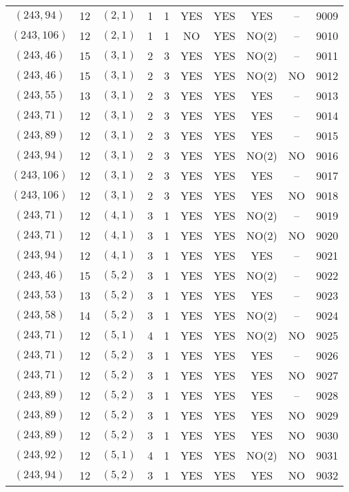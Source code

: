 \begin{longtable}{|c|c|c|c|c|c|c|c|c|c|}
$(243, 94)$ & 12 & $(2, 1)$ & 1 & 1 & YES & YES & YES & -- & 9009\\
$(243, 106)$ & 12 & $(2, 1)$ & 1 & 1 & NO & YES & NO(2) & -- & 9010\\
$(243, 46)$ & 15 & $(3, 1)$ & 2 & 3 & YES & YES & NO(2) & -- & 9011\\
$(243, 46)$ & 15 & $(3, 1)$ & 2 & 3 & YES & YES & NO(2) & NO & 9012\\
$(243, 55)$ & 13 & $(3, 1)$ & 2 & 3 & YES & YES & YES & -- & 9013\\
$(243, 71)$ & 12 & $(3, 1)$ & 2 & 3 & YES & YES & YES & -- & 9014\\
$(243, 89)$ & 12 & $(3, 1)$ & 2 & 3 & YES & YES & YES & -- & 9015\\
$(243, 94)$ & 12 & $(3, 1)$ & 2 & 3 & YES & YES & NO(2) & NO & 9016\\
$(243, 106)$ & 12 & $(3, 1)$ & 2 & 3 & YES & YES & YES & -- & 9017\\
$(243, 106)$ & 12 & $(3, 1)$ & 2 & 3 & YES & YES & YES & NO & 9018\\
$(243, 71)$ & 12 & $(4, 1)$ & 3 & 1 & YES & YES & NO(2) & -- & 9019\\
$(243, 71)$ & 12 & $(4, 1)$ & 3 & 1 & YES & YES & NO(2) & NO & 9020\\
$(243, 94)$ & 12 & $(4, 1)$ & 3 & 1 & YES & YES & YES & -- & 9021\\
$(243, 46)$ & 15 & $(5, 2)$ & 3 & 1 & YES & YES & NO(2) & -- & 9022\\
$(243, 53)$ & 13 & $(5, 2)$ & 3 & 1 & YES & YES & YES & -- & 9023\\
$(243, 58)$ & 14 & $(5, 2)$ & 3 & 1 & YES & YES & NO(2) & -- & 9024\\
$(243, 71)$ & 12 & $(5, 1)$ & 4 & 1 & YES & YES & NO(2) & NO & 9025\\
$(243, 71)$ & 12 & $(5, 2)$ & 3 & 1 & YES & YES & YES & -- & 9026\\
$(243, 71)$ & 12 & $(5, 2)$ & 3 & 1 & YES & YES & YES & NO & 9027\\
$(243, 89)$ & 12 & $(5, 2)$ & 3 & 1 & YES & YES & YES & -- & 9028\\
$(243, 89)$ & 12 & $(5, 2)$ & 3 & 1 & YES & YES & YES & NO & 9029\\
$(243, 89)$ & 12 & $(5, 2)$ & 3 & 1 & YES & YES & YES & NO & 9030\\
$(243, 92)$ & 12 & $(5, 1)$ & 4 & 1 & YES & YES & NO(2) & NO & 9031\\
$(243, 94)$ & 12 & $(5, 2)$ & 3 & 1 & YES & YES & YES & NO & 9032\\

\end{longtable}
